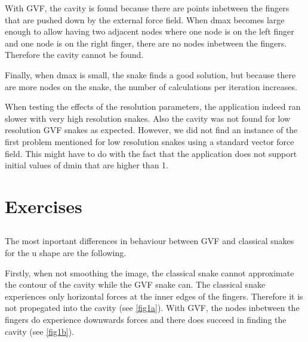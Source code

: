 \documentclass{article}
\begin{document}
With GVF, the cavity is found because there are points inbetween the fingers that are pushed down by the external force field. When dmax becomes large enough to allow having two adjacent nodes where one node is on the left finger and one node is on the right finger, there are no nodes inbetween the fingers. Therefore the cavity cannot be found.

Finally, when dmax is small, the snake finds a good solution, but because there are more nodes on the snake, the number of calculations per iteration increases.

When testing the effects of the resolution parameters, the application indeed ran slower with very high resolution snakes. Also the cavity was not found for low resolution GVF snakes as expected. However, we did not find an instance of the first problem mentioned for low resolution snakes using a standard vector force field. This might have to do with the fact that the application does not support initial values of dmin that are higher than 1.

\renewcommand{\thesubsection}{\large{Exercise \arabic{subsection}}}
\section{Exercises}
\subsection{}
The most inportant differences in behaviour between GVF and classical snakes for the u shape are the following. 

Firstly, when not smoothing the image, the classical snake cannot approximate the contour of the cavity while the GVF snake can. The classical snake experiences only horizontal forces at the inner edges of the fingers. Therefore it is not propegated into the cavity (see \ref{fig1a}). With GVF, the nodes inbetween the fingers do experience downwards forces and there does succeed in finding the cavity (see \ref{fig1b}).
\end{document}

